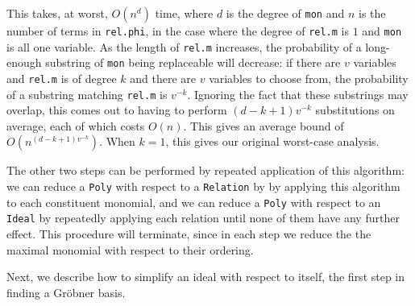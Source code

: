\begin{alg}
\begin{comment}
// Reduce a Poly with respect to an ideal, by
// reducing with respect to each relation until 
// until we obtain a Poly fixed by all of them.
function reduce(poly: Poly, ideal: Ideal) {
    let last = poly
    let result = poly
    while true {
        for relation in ideal {
            result = reduce(result, ideal)
        }
        if result == last {
            break
        } else {
            last = result
        }
    }
    return result
}
\end{comment}
    This takes, at worst, $O(n^d)$ time, where $d$ is the
    degree of \verb|mon| and $n$ is the number of terms in \verb|rel.phi|,
    in the case where the degree of \verb|rel.m| is $1$ and \verb|mon| is all one
    variable. As the length of \verb|rel.m| increases, the probability of a long-enough
    substring of \verb|mon| being replaceable will decrease: if there are $v$ variables
    and \verb|rel.m| is of degree $k$ and there are $v$ variables to choose from,
    the probability of a substring matching \verb|rel.m| is $v^{-k}$. Ignoring
    the fact that these substrings may overlap, this comes out to having to perform
    $(d-k+1)v^{-k}$ substitutions on average, each of which costs $O(n)$. This gives
    an average bound of $O(n^{(d-k+1)v^{-k}})$. When $k=1$, this gives our original
    worst-case analysis.
    
    The other two steps can be performed by repeated application of this algorithm:
    we can reduce a \verb|Poly| with respect to a \verb|Relation| by by applying 
    this algorithm to each constituent monomial, and we can reduce a \verb|Poly| with
    respect to an \verb|Ideal| by repeatedly applying each relation until none of them
    have any further effect. This procedure will terminate, since in each step
    we reduce the the maximal monomial with respect to their ordering.
\end{alg}

Next, we describe how to simplify an ideal with respect to itself, the first
step in finding a Gr\"obner basis.

